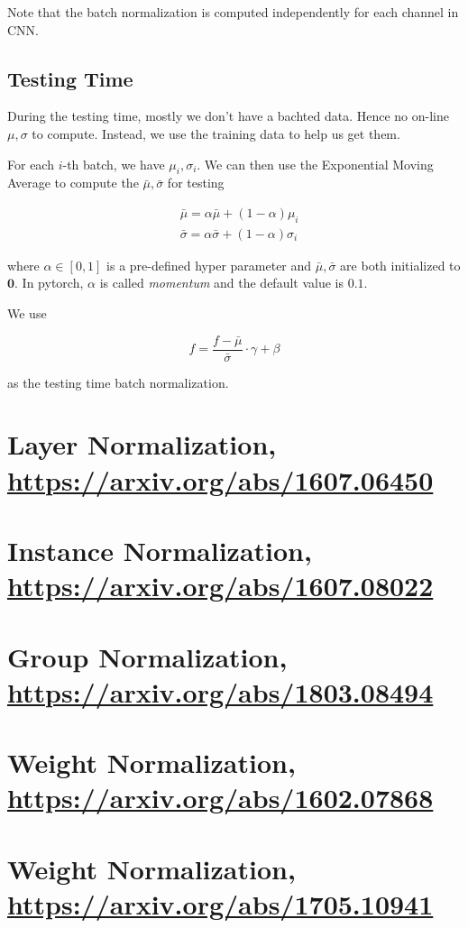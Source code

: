 \documentclass{article}
\begin{document}
            Note that the batch normalization is computed independently for
            each channel in CNN.

        \subsection*{Testing Time}

            During the testing time, mostly we don't have a bachted data. Hence
            no on-line $ \mu, \sigma $ to compute. Instead, we use the training
            data to help us get them.

            For each $ i $-th batch, we have $ \mu_{i}, \sigma_{i} $. We can then use the
            Exponential Moving Average to compute the $ \bar{\mu}, \bar{\sigma} $ for testing

            \begin{align*}
                & \bar{\mu} = \alpha \bar{\mu} + ( 1 - \alpha ) \mu_{i} \\
                & \bar{\sigma} = \alpha \bar{\sigma} + ( 1 - \alpha ) \sigma_{i}
            \end{align*}

            where $ \alpha \in [0, 1] $ is a pre-defined hyper parameter and $ \bar{\mu},
            \bar{\sigma} $ are both initialized to $ \mathbf{0} $. In pytorch,
            $ \alpha $ is called \textit{momentum} and the default value is $
            0.1 $.

            We use

            \begin{equation*}
                 \hat{f} = \frac{f - \bar{\mu}}{\bar{\sigma}} \cdot \gamma + \beta
            \end{equation*}

            as the testing time batch normalization.

    \section*{Layer Normalization, \href{https://arxiv.org/abs/1607.06450}{https://arxiv.org/abs/1607.06450}}
        

    \section*{Instance Normalization, \href{https://arxiv.org/abs/1607.08022}{https://arxiv.org/abs/1607.08022}}
        
        
    \section*{Group Normalization, \href{https://arxiv.org/abs/1803.08494}{https://arxiv.org/abs/1803.08494}}
        

    \section*{Weight Normalization, \href{https://arxiv.org/abs/1602.07868}{https://arxiv.org/abs/1602.07868}}
        

    \section*{Weight Normalization, \href{https://arxiv.org/abs/1705.10941}{https://arxiv.org/abs/1705.10941}}
        
\end{document}
